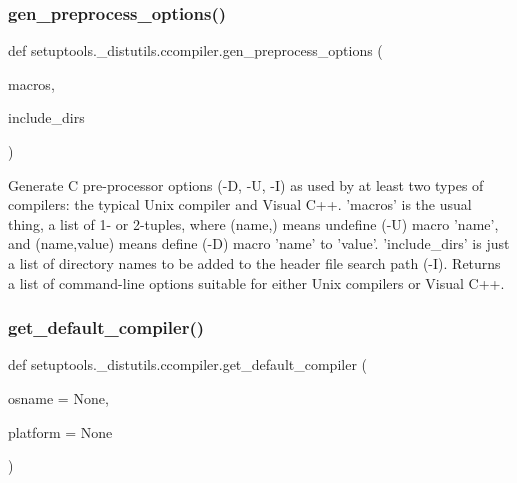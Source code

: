 \subsubsection{\texorpdfstring{gen\+\_\+preprocess\+\_\+options()}{gen\_preprocess\_options()}}
{\footnotesize\ttfamily def setuptools.\+\_\+distutils.\+ccompiler.\+gen\+\_\+preprocess\+\_\+options (\begin{DoxyParamCaption}\item[{}]{macros,  }\item[{}]{include\+\_\+dirs }\end{DoxyParamCaption})}

\begin{DoxyVerb}Generate C pre-processor options (-D, -U, -I) as used by at least
two types of compilers: the typical Unix compiler and Visual C++.
'macros' is the usual thing, a list of 1- or 2-tuples, where (name,)
means undefine (-U) macro 'name', and (name,value) means define (-D)
macro 'name' to 'value'.  'include_dirs' is just a list of directory
names to be added to the header file search path (-I).  Returns a list
of command-line options suitable for either Unix compilers or Visual
C++.
\end{DoxyVerb}
 \mbox{\label{namespacesetuptools_1_1__distutils_1_1ccompiler_afbcbb6febf94a459bb5f8329bd2dcb9b}} 
\subsubsection{\texorpdfstring{get\+\_\+default\+\_\+compiler()}{get\_default\_compiler()}}
{\footnotesize\ttfamily def setuptools.\+\_\+distutils.\+ccompiler.\+get\+\_\+default\+\_\+compiler (\begin{DoxyParamCaption}\item[{}]{osname = {\ttfamily None},  }\item[{}]{platform = {\ttfamily None} }\end{DoxyParamCaption})}

